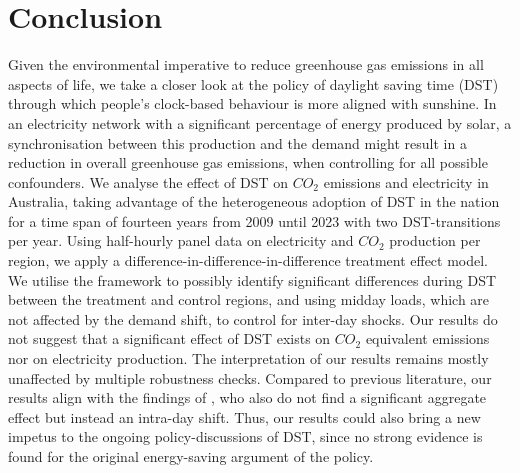 \section{Conclusion}
Given the environmental imperative to reduce greenhouse gas emissions in all aspects of life, we take a closer look at the policy of daylight saving time (\ac{DST}) through which people's clock-based behaviour is more aligned with sunshine. In an electricity network with a significant percentage of energy produced by solar, a synchronisation between this production and the demand might result in a reduction in overall greenhouse gas emissions, when controlling for all possible confounders. 
We analyse the effect of DST on $CO_2$ emissions and electricity in Australia, taking advantage of the heterogeneous adoption of DST in the nation for a time span of fourteen years from 2009 until 2023 with two \ac{DST}-transitions per year. Using half-hourly panel data on electricity and $CO_2$ production per region, we apply a difference-in-difference-in-difference treatment effect model. We utilise the framework to possibly identify significant differences during \ac{DST} between the treatment and control regions, and using midday loads, which are not affected by the demand shift, to control for inter-day shocks. Our results do not suggest that a significant effect of DST exists on $CO_2$ equivalent emissions nor on electricity production. The interpretation of our results remains mostly unaffected by multiple robustness checks. Compared to previous literature, our results align with the findings of \textcites{kellogg_daylight_2008}, who also do not find a significant aggregate effect but instead an intra-day shift. 
Thus, our results could also bring a new impetus to the ongoing policy-discussions of \ac{DST}, since no strong evidence is found for the original energy-saving argument of the policy. 